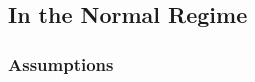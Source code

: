 \documentclass[twoside]{article}
\newtheorem{theorem}{Theorem}
\newcommand{\zero}{\text{\textbf{0}}}
\newcommand{\w}{\theta}
\newcommand{\wmle}{\hat\w^{mle}}
\newcommand{\wstar}{{\w^{*}}}
\newcommand{\I}{\mathcal I}
\newcommand{\normal}[2]{\ensuremath{\mathcal{N}\left({{#1}},{{#2}}\right)}}
\newcommand{\ltwo}[1]{{\left\lVert {#1} \right\rVert}}
\newcommand{\prob}[1]{\Pr\left[{#1}\right]}
\begin{document}
\subsection{In the Normal Regime}
%
%

\subsubsection{Assumptions}
\end{document}
